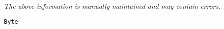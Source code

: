 \label{pkg:byte}

{\tiny \it The above information is manually maintained and may contain errors.}
\begin{verbatim}
Byte
\end{verbatim}
